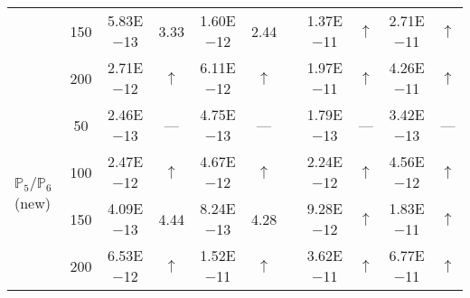 \begin{table}[H]
{\begin{tabular}{@{}l c c c c c c c c c c@{}}
 & 150 & 5.83E$-$13 & 3.33  & 1.60E$-$12 & 2.44 &  & 1.37E$-$11 & $\uparrow$ & 2.71E$-$11 & $\uparrow$\\
 & 200 & 2.71E$-$12 & $\uparrow$  & 6.11E$-$12 & $\uparrow$ &  & 1.97E$-$11 & $\uparrow$ & 4.26E$-$11 & $\uparrow$\\
\midrule
\multirow{4}{*}{$\mathbb{P}_{5}/\mathbb{P}_{6}$ (new)}
 & 50 & 2.46E$-$13 & ---  & 4.75E$-$13 & --- &  & 1.79E$-$13 & --- & 3.42E$-$13 & ---\\
 & 100 & 2.47E$-$12 & $\uparrow$  & 4.67E$-$12 & $\uparrow$ &  & 2.24E$-$12 & $\uparrow$ & 4.56E$-$12 & $\uparrow$\\
 & 150 & 4.09E$-$13 & 4.44  & 8.24E$-$13 & 4.28 &  & 9.28E$-$12 & $\uparrow$ & 1.83E$-$11 & $\uparrow$\\
 & 200 & 6.53E$-$12 & $\uparrow$  & 1.52E$-$11 & $\uparrow$ &  & 3.62E$-$11 & $\uparrow$ & 6.77E$-$11 & $\uparrow$\\
\bottomrule
\end{tabular}}
\label{none}
\end{table}

